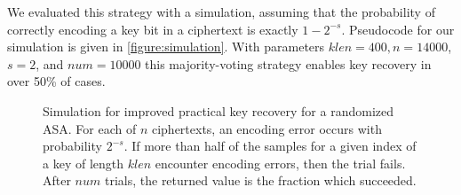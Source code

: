 \iffullversion
We evaluated this strategy with a simulation, assuming that the probability of correctly encoding a key bit in a ciphertext is exactly $1-2^{-s}$. Pseudocode for our simulation is given in \autoref{figure:simulation}. With parameters $klen=400, n=14000$, $s=2$, and $num=10000$ this majority-voting strategy enables key recovery in over 50\% of cases.

\begin{figure}
\centering
{}
\caption[Simulation for improved practical key recovery for a randomized ASA]{Simulation for improved practical key recovery for a randomized ASA. For each of $n$ ciphertexts, an encoding error occurs with probability $2^{-s}$. If more than half of the samples for a given index of a key of length $klen$ encounter encoding errors, then the trial fails. After $num$ trials, the returned value is the fraction which succeeded.}
\label{figure:simulation}
\end{figure}

